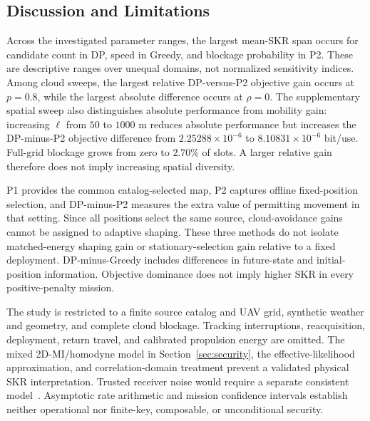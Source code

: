 \subsection{Discussion and Limitations}
Across the investigated parameter ranges, the largest mean-SKR span
occurs for candidate count in DP, speed in Greedy, and blockage
probability in P2. These are descriptive ranges over unequal domains,
not normalized sensitivity indices. Among cloud sweeps, the largest
relative DP-versus-P2 objective gain occurs at $p=0.8$, while the
largest absolute difference occurs at $\rho=0$. The supplementary
spatial sweep also distinguishes absolute performance from mobility
gain: increasing $\ell$ from $50$ to $1000$ m reduces absolute
performance but increases the DP-minus-P2 objective difference from
$2.25288\times10^{-6}$ to $8.10831\times10^{-6}$ bit/use. Full-grid
blockage grows from zero to $2.70\%$ of slots. A larger relative gain
therefore does not imply increasing spatial diversity.

P1 provides the common catalog-selected map, P2 captures offline
fixed-position selection, and DP-minus-P2 measures the extra value
of permitting movement in that setting. Since all positions select
the same source, cloud-avoidance gains cannot be assigned to adaptive
shaping. These three methods do not isolate matched-energy shaping
gain or stationary-selection gain relative to a fixed deployment.
DP-minus-Greedy includes differences in future-state and initial-position
information. Objective dominance does not imply higher SKR in every
positive-penalty mission.

The study is restricted to a finite source catalog and UAV grid,
synthetic weather and geometry, and complete cloud blockage. Tracking
interruptions, reacquisition, deployment, return travel, and calibrated
propulsion energy are omitted. The mixed 2D-MI/homodyne model in
Section~\ref{sec:security}, the effective-likelihood approximation,
and correlation-domain treatment prevent a validated physical SKR
interpretation. Trusted receiver noise would require a separate
consistent model~\cite{usenko2016}. Asymptotic rate arithmetic and
mission confidence intervals establish neither operational nor
finite-key, composable, or unconditional security.

